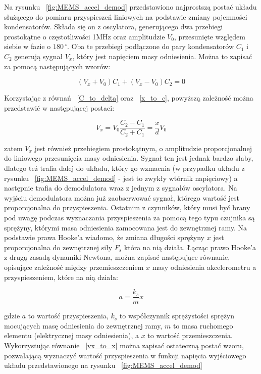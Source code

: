 Na rysunku ~\ref{fig:MEMS_accel_demod} przedstawiono najprostszą postać układu służącego do pomiaru przyspieszeń liniowych na podstawie zmiany pojemności kondensatorów. Składa się on z oscylatora, generującego dwa przebiegi prostokątne o częstotliwości 1MHz oraz amplitudzie $V_0$, przesunięte względem siebie w fazie o $180\,^{\circ}$. Oba te przebiegi podłączone do pary kondensatorów $C_1$ i $C_2$ generują sygnał $V_x$, który jest napięciem masy odniesienia. Można to zapisać za pomocą następujących wzorów:

\begin{equation}
	(V_x + V_0)C_1 + (V_x - V_0)C_2 = 0
\end{equation}  

Korzystając z równań ~\ref{C_to_delta} oraz ~\ref{x_to_c}, powyższą zależność można przedstawić w następującej postaci:

\begin{equation}
V_x = V_0\frac{C_2 - C_1}{C_2 + C_1} = \frac{x}{d}V_0
\label{vx_to_x}
\end{equation}

zatem $V_x$ jest również przebiegiem prostokątnym, o amplitudzie proporcjonalnej do liniowego przesunięcia masy odniesienia. Sygnał ten jest jednak bardzo słaby, dlatego też trafia dalej do układu, który go wzmacnia (w przypadku układu z rysunku ~\ref{fig:MEMS_accel_demod} -  jest to zwykły wtórnik napięciowy) a następnie trafia do demodulatora wraz z jednym z sygnałów oscylatora. Na wyjściu demodulatora można już zaobserwować sygnał, którego wartość jest proporcjonalna do przyspieszenia. Ostatnim z czynników, który musi być brany pod uwagę podczas wyznaczania przyspieszenia za pomocą tego typu czujnika są sprężyny, którymi masa odniesienia zamocowana jest do zewnętrznej ramy. Na podstawie prawa Hooke'a wiadomo, że zmiana długości sprężyny $x$ jest proporcjonalna do zewnętrznej siły $F_s$ która na nią działa. Łącząc prawo Hooke'a z drugą zasadą dynamiki Newtona, można zapisać następujące równanie, opisujące zależność między przemieszczeniem $x$ masy odniesienia akcelerometru a przyspieszeniem, które na nią działa:

\begin{equation}
	a = \frac{k_s}{m}x
\end{equation}  

gdzie $a$ to wartość przyspieszenia, $k_s$ to współczynnik sprężystości sprężyn mocujących masę odniesienia do zewnętrznej ramy, $m$ to masa ruchomego elementu (elektrycznej masy odniesienia), a $x$ to wartość przemieszczenia. Wykorzystując równanie ~\ref{vx_to_x} można zapisać ostateczną postać wzoru, pozwalającą wyznaczyć wartość przyspieszenia w funkcji napięcia wyjściowego układu przedstawionego na rysunku ~\ref{fig:MEMS_accel_demod}

